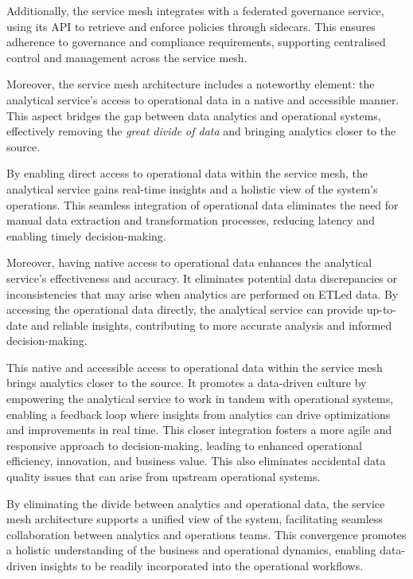 \documentclass[preprint,12pt]{elsarticle}
\begin{document}
\begin{enumerate}
    Additionally, the service mesh integrates with a federated governance service, using its API to retrieve and enforce policies through sidecars. This ensures adherence to governance and compliance requirements, supporting centralised control and management across the service mesh.
     
    Moreover, the service mesh architecture includes a noteworthy element: the analytical service's access to operational data in a native and accessible manner. This aspect bridges the gap between data analytics and operational systems, effectively removing the \emph{great divide of data} and bringing analytics closer to the source.

    By enabling direct access to operational data within the service mesh, the analytical service gains real-time insights and a holistic view of the system's operations. This seamless integration of operational data eliminates the need for manual data extraction and transformation processes, reducing latency and enabling timely decision-making.
    
    Moreover, having native access to operational data enhances the analytical service's effectiveness and accuracy. It eliminates potential data discrepancies or inconsistencies that may arise when analytics are performed on ETLed data. By accessing the operational data directly, the analytical service can provide up-to-date and reliable insights, contributing to more accurate analysis and informed decision-making.
    
    This native and accessible access to operational data within the service mesh brings analytics closer to the source. It promotes a data-driven culture by empowering the analytical service to work in tandem with operational systems, enabling a feedback loop where insights from analytics can drive optimizations and improvements in real time. This closer integration fosters a more agile and responsive approach to decision-making, leading to enhanced operational efficiency, innovation, and business value. This also eliminates accidental data quality issues that can arise from upstream operational systems.
    
    By eliminating the divide between analytics and operational data, the service mesh architecture supports a unified view of the system, facilitating seamless collaboration between analytics and operations teams. This convergence promotes a holistic understanding of the business and operational dynamics, enabling data-driven insights to be readily incorporated into the operational workflows.


\end{enumerate}
\end{document}
